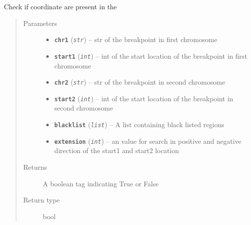 \documentclass[letterpaper,10pt,english]{sphinxmanual}
\begin{document}
\begin{fulllineitems}
\label{iCallSV:iCallSV.checkBlackList.CheckIfItIsBlacklisted}
Check if coordinate are present in the 
\begin{quote}\begin{description}
\item[{Parameters}] \leavevmode\begin{itemize}
\item {} 
\textbf{\texttt{chr1}} (\emph{\texttt{str}}) -- str of the breakpoint in first chromosome

\item {} 
\textbf{\texttt{start1}} (\emph{\texttt{int}}) -- int of the start location of the breakpoint in first chromosome

\item {} 
\textbf{\texttt{chr2}} (\emph{\texttt{str}}) -- str of the breakpoint in second chromosome

\item {} 
\textbf{\texttt{start2}} (\emph{\texttt{int}}) -- int of the start location of the breakpoint in second chromosome

\item {} 
\textbf{\texttt{blacklist}} (\emph{\texttt{list}}) -- A list containing black listed regions

\item {} 
\textbf{\texttt{extension}} (\emph{\texttt{int}}) -- an value for search in positive and negative direction of the start1 and start2 location

\end{itemize}

\item[{Returns}] \leavevmode
A boolean tag indicating True or False

\item[{Return type}] \leavevmode
bool

\end{description}\end{quote}

\end{fulllineitems}

\end{document}

